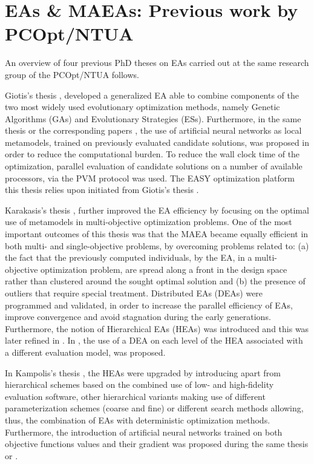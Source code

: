    

\section{EAs \& MAEAs: Previous work by PCOpt/NTUA} %
\label{PRW}
An overview of four previous PhD theses on EAs carried out at the same research group of the PCOpt/NTUA follows. 

Giotis's thesis \cite{phd_Giotis}, developed a generalized EA able to combine components of the two most widely used evolutionary optimization methods, namely Genetic Algorithms (GAs) and Evolutionary Strategies (ESs). Furthermore, in the same thesis or the corresponding papers \cite{kn:Emm2002,LTT_2_018,LTT_2_023}, the use of artificial neural networks as local metamodels, trained on previously evaluated candidate solutions, was proposed in order to reduce the computational burden. To reduce the wall clock time of the optimization, parallel evaluation of candidate solutions on a number of available processors, via the PVM protocol was used. The EASY optimization platform this thesis relies upon initiated from Giotis's thesis \cite{phd_Giotis}.   

Karakasis's  thesis \cite{phd_Karakasis}, further improved the EA efficiency by focusing on the optimal use of metamodels in multi-objective optimization problems. One of the most important outcomes of this thesis was that the MAEA became equally efficient in both multi- and single-objective problems, by overcoming problems related to: (a) the fact that the previously computed individuals, by the EA, in a multi-objective optimization problem, are spread along a front in the design space rather than clustered around the sought optimal solution and (b) the presence of outliers that require special treatment. Distributed EAs (DEAs) were programmed and validated, in order to increase the parallel efficiency of EAs, improve convergence and avoid stagnation during the early generations. Furthermore, the notion of Hierarchical EAs (HEAs) was introduced and this  was later refined in \cite{phd_Kampolis}.    In \cite{phd_Karakasis}, the use of a DEA on each level of the HEA associated with a different evaluation model, was proposed.

In Kampolis's thesis \cite{phd_Kampolis}, the HEAs were upgraded by introducing apart from hierarchical schemes based on the combined use of low- and high-fidelity evaluation software, other hierarchical variants making use of different parameterization schemes (coarse and fine) or different search methods allowing, thus, the combination of EAs with deterministic optimization methods. Furthermore, the introduction of artificial neural networks trained on both objective functions values and their gradient was proposed during the same thesis or \cite{LTT_2_026}.          

